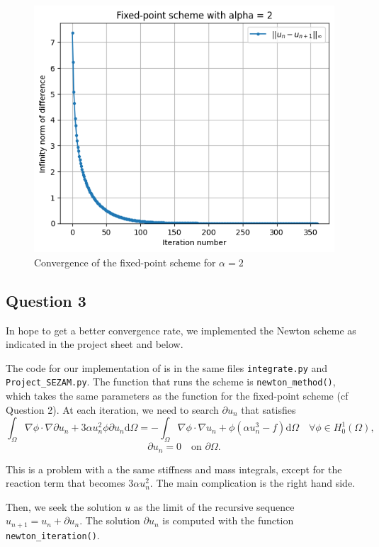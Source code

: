 \documentclass[11pt, a4paper, twoside]{article}
\newcommand{\grad}{\nabla} %
\newcommand{\Hunz}{H^1_0(\Omega)}
\newcommand{\intom}{\int_\Omega}
\renewcommand{\d}{\text{d}}
\begin{document}
\begin{figure}[H]
\centering
\includegraphics[scale = 0.7]{../Figures/fixed_conv_alpha2.png}
\caption{Convergence of the fixed-point scheme for $\alpha=2$}
\label{q2fig4}
\end{figure}


\subsection*{Question 3}
In hope to get a better convergence rate, we implemented the Newton scheme as indicated in the project sheet and below.

The code for our implementation of is in the same files \verb+integrate.py+ and \verb+Project_SEZAM.py+. The function that runs the scheme is \verb+newton_method()+, which takes the same parameters as the function for the fixed-point scheme (cf Question 2).
At each iteration, we need to search $\partial u_n$ that satisfies 
$$\intom \grad \phi \cdot \grad \partial u_n + 3\alpha u_n^2 \phi \partial u_n \d\Omega = - \intom \grad \phi \cdot \grad u_n + \phi (\alpha u_n^3 - f) \d\Omega \quad \forall \phi\in \Hunz, $$
$$\partial u_n = 0 \quad \text{on } \partial\Omega.$$

This is a problem with a the same stiffness and mass integrals, except for the reaction term that becomes $3\alpha u_n^2$. The main complication is the right hand side.

Then, we seek the solution $u$ as the limit of the recursive sequence $u_{n+1} =u_n + \partial u_n$.
The solution $\partial u_n$ is computed with the function \verb+newton_iteration()+.
\end{document}
